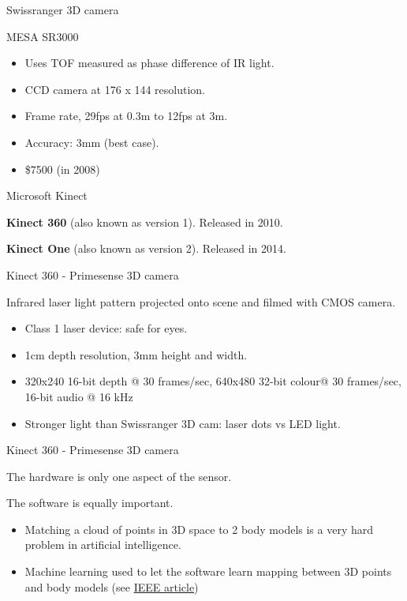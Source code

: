 \documentclass[compress]{beamer}
\providecommand{\tightlist}{%
  \setlength{\itemsep}{0pt}\setlength{\parskip}{0pt}}
\begin{document}
\begin{frame}{Swissranger 3D camera}

MESA SR3000

\begin{itemize}
\tightlist
\item
  Uses TOF measured as phase difference of IR light.
\item
  CCD camera at 176 x 144 resolution.
\item
  Frame rate, 29fps at 0.3m to 12fps at 3m.
\item
  Accuracy: 3mm (best case).
\item
  \$7500 (in 2008)
\end{itemize}

\end{frame}

\begin{frame}{Microsoft Kinect}

\textbf{Kinect 360} (also known as version 1). Released in 2010.

\textbf{Kinect One} (also known as version 2). Released in 2014.

\end{frame}

\begin{frame}{Kinect 360 - Primesense 3D camera}

Infrared laser light pattern projected onto scene and filmed with CMOS
camera.

\begin{itemize}
\tightlist
\item
  Class 1 laser device: safe for eyes.
\item
  1cm depth resolution, 3mm height and width.
\item
  320x240 16-bit depth @ 30 frames/sec, 640x480 32-bit colour@ 30
  frames/sec, 16-bit audio @ 16 kHz
\item
  Stronger light than Swissranger 3D cam: laser dots vs LED light.
\end{itemize}

\end{frame}

\begin{frame}{Kinect 360 - Primesense 3D camera}

The hardware is only one aspect of the sensor.

The software is equally important.

\begin{itemize}
\tightlist
\item
  Matching a cloud of points in 3D space to 2 body models is a very hard
  problem in artificial intelligence.
\item
  Machine learning used to let the software learn mapping between 3D
  points and body models (see
  \href{http://www.theinstitute.ieee.org/portal/site/tionline/menuitem.130a3558587d56e8fb2275875bac26c8/index.jsp?\&pName=institute_level1_article\&TheCat=2201\&article=tionline/legacy/inst2011/jan11/featuretech.xml\&}{IEEE
  article})
\end{itemize}

\end{frame}
\end{document}
